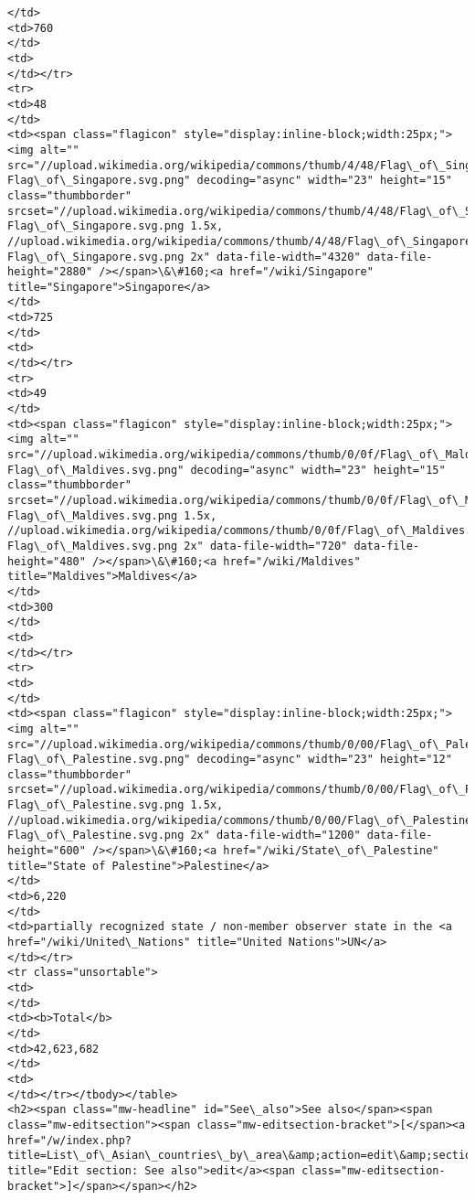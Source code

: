 \documentclass[11pt]{article}
\begin{document}
\begin{Verbatim}[commandchars=\\\{\}]
</td>
<td>760
</td>
<td>
</td></tr>
<tr>
<td>48
</td>
<td><span class="flagicon" style="display:inline-block;width:25px;"><img alt="" src="//upload.wikimedia.org/wikipedia/commons/thumb/4/48/Flag\_of\_Singapore.svg/23px-Flag\_of\_Singapore.svg.png" decoding="async" width="23" height="15" class="thumbborder" srcset="//upload.wikimedia.org/wikipedia/commons/thumb/4/48/Flag\_of\_Singapore.svg/35px-Flag\_of\_Singapore.svg.png 1.5x, //upload.wikimedia.org/wikipedia/commons/thumb/4/48/Flag\_of\_Singapore.svg/45px-Flag\_of\_Singapore.svg.png 2x" data-file-width="4320" data-file-height="2880" /></span>\&\#160;<a href="/wiki/Singapore" title="Singapore">Singapore</a>
</td>
<td>725
</td>
<td>
</td></tr>
<tr>
<td>49
</td>
<td><span class="flagicon" style="display:inline-block;width:25px;"><img alt="" src="//upload.wikimedia.org/wikipedia/commons/thumb/0/0f/Flag\_of\_Maldives.svg/23px-Flag\_of\_Maldives.svg.png" decoding="async" width="23" height="15" class="thumbborder" srcset="//upload.wikimedia.org/wikipedia/commons/thumb/0/0f/Flag\_of\_Maldives.svg/35px-Flag\_of\_Maldives.svg.png 1.5x, //upload.wikimedia.org/wikipedia/commons/thumb/0/0f/Flag\_of\_Maldives.svg/45px-Flag\_of\_Maldives.svg.png 2x" data-file-width="720" data-file-height="480" /></span>\&\#160;<a href="/wiki/Maldives" title="Maldives">Maldives</a>
</td>
<td>300
</td>
<td>
</td></tr>
<tr>
<td>
</td>
<td><span class="flagicon" style="display:inline-block;width:25px;"><img alt="" src="//upload.wikimedia.org/wikipedia/commons/thumb/0/00/Flag\_of\_Palestine.svg/23px-Flag\_of\_Palestine.svg.png" decoding="async" width="23" height="12" class="thumbborder" srcset="//upload.wikimedia.org/wikipedia/commons/thumb/0/00/Flag\_of\_Palestine.svg/35px-Flag\_of\_Palestine.svg.png 1.5x, //upload.wikimedia.org/wikipedia/commons/thumb/0/00/Flag\_of\_Palestine.svg/46px-Flag\_of\_Palestine.svg.png 2x" data-file-width="1200" data-file-height="600" /></span>\&\#160;<a href="/wiki/State\_of\_Palestine" title="State of Palestine">Palestine</a>
</td>
<td>6,220
</td>
<td>partially recognized state / non-member observer state in the <a href="/wiki/United\_Nations" title="United Nations">UN</a>
</td></tr>
<tr class="unsortable">
<td>
</td>
<td><b>Total</b>
</td>
<td>42,623,682
</td>
<td>
</td></tr></tbody></table>
<h2><span class="mw-headline" id="See\_also">See also</span><span class="mw-editsection"><span class="mw-editsection-bracket">[</span><a href="/w/index.php?title=List\_of\_Asian\_countries\_by\_area\&amp;action=edit\&amp;section=1" title="Edit section: See also">edit</a><span class="mw-editsection-bracket">]</span></span></h2>

\end{Verbatim}
\end{document}
